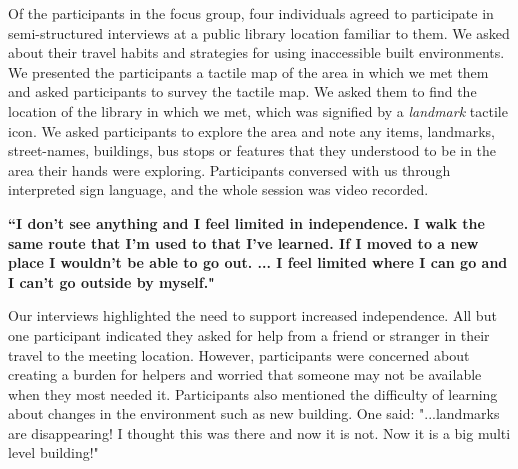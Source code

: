 Of the participants in the focus group, four individuals agreed to participate in semi-structured interviews at a public library location familiar to them. We asked about their travel habits and strategies for using inaccessible built environments.
We presented the participants a tactile map of the area in which we met them and asked participants to survey the tactile map. We asked them to find the location of the library in which we met, which was signified by a \textit{landmark} tactile icon.  We asked participants to explore the area and note any items, landmarks, street-names, buildings, bus stops or features that they understood to be in the area their hands were exploring. %
Participants conversed with us through  interpreted sign language, and the whole session was video recorded. %


\textbf{“I don’t see anything and I feel limited in independence. I walk the same route that I’m used to that I’ve learned. If I moved to a new place I wouldn’t be able to go out. ... I feel limited where I can go and I can’t go outside by myself."}

Our interviews highlighted the need to support increased independence. All but one participant indicated they asked for help from a friend or stranger in their travel to the meeting location. %
However, participants were concerned about creating a burden for helpers and worried that someone may not be available when they most needed it. 
Participants also mentioned the difficulty of learning about changes in the environment such as new building. One said: %
"...landmarks are disappearing! I thought this was there and now it is not. Now it is a big multi level building!" 

